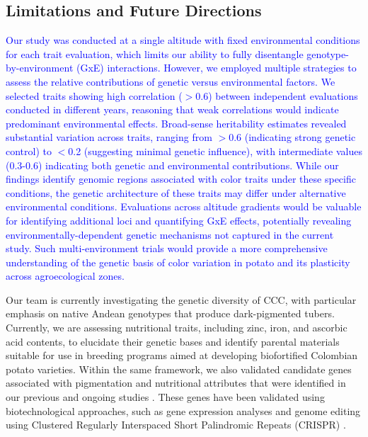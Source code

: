 \documentclass[pdflatex,sn-mathphys-ay]{sn-jnl}%
\begin{document}
\subsection{Limitations and Future Directions}

\textcolor{blue}{Our study was conducted at a single altitude with fixed environmental conditions for each trait evaluation, which limits our ability to fully disentangle genotype-by-environment (GxE) interactions. However, we employed multiple strategies to assess the relative contributions of genetic versus environmental factors. We selected traits showing high correlation ($>$0.6) between independent evaluations conducted in different years, reasoning that weak correlations would indicate predominant environmental effects. Broad-sense heritability estimates revealed substantial variation across traits, ranging from $>$0.6 (indicating strong genetic control) to $<$0.2 (suggesting minimal genetic influence), with intermediate values (0.3-0.6) indicating both genetic and environmental contributions. While our findings identify genomic regions associated with color traits under these specific conditions, the genetic architecture of these traits may differ under alternative environmental conditions. Evaluations across altitude gradients would be valuable for identifying additional loci and quantifying GxE effects, potentially revealing environmentally-dependent genetic mechanisms not captured in the current study. Such multi-environment trials would provide a more comprehensive understanding of the genetic basis of color variation in potato and its plasticity across agroecological zones.
}





Our team is currently investigating the genetic diversity of CCC, with particular emphasis on native Andean genotypes that produce dark-pigmented tubers. Currently, we are assessing nutritional traits, including zinc, iron, and ascorbic acid contents, to elucidate their genetic bases and identify parental materials suitable for use in breeding programs aimed at developing biofortified Colombian potato varieties. Within the same framework, we also validated candidate genes associated with pigmentation and nutritional attributes that were identified in our previous and ongoing studies \citep{berdugo2023phenotypic, Berdugo2017}. These genes have been validated using biotechnological approaches, such as gene expression analyses and genome editing using Clustered Regularly Interspaced Short Palindromic Repeats (CRISPR) \citep{Berdugo2024}.
\end{document}
